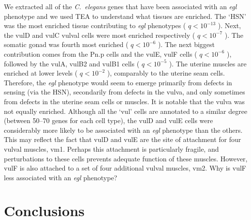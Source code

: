 \documentclass[10pt,letterpaper,twocolumn]{article}
\newcommand{\cel}{\emph{C.~elegans}}
\newcommand{\qval}[1]{
                      \ensuremath{
                                  q<10^{-#1}
                                  }
                      }
\begin{document}
We extracted all of the \cel{} genes that have been associated with an \emph{egl}
phenotype and we used TEA to understand what tissues are enriched. The `HSN'
was the most enriched tissue contributing to \emph{egl} phenotypes (\qval{13}).
Next, the vulD and vulC vulval cells were most enriched respectively (\qval{7}).
The somatic gonad was fourth most enriched (\qval{6}). The next biggest contribution
comes from the Pn.p cells and the vulE, vulF cells (\qval{6}), followed by the
vulA, vulB2 and vulB1 cells (\qval{5}). The uterine muscles are enriched at lower
levels (\qval{2}), comparably to the uterine seam cells. Therefore, the \emph{egl}
phenotype would seem to emerge primarily from defects in sensing (via the HSN),
secondarily from defects in the vulva, and only sometimes from defects in the
uterine seam cells or muscles. It is notable that the vulva was not equally
enriched. Although all the `vul' cells are annotated to a similar degree (between
50--70 genes for each cell type), the vulD and vulE cells were considerably more
likely to be associated with an \emph{egl} phenotype than the others. This may
reflect the fact that vulD and vulE are the site of attachment for four vulval
muscles, vm1. Perhaps this attachment is particularly fragile, and perturbations
to these cells prevents adequate function of these muscles. However, vulF is
also attached to a set of four additional vulval muscles, vm2. Why
is vulF less associated with an \emph{egl} phenotype?

\section*{Conclusions}
\end{document}
